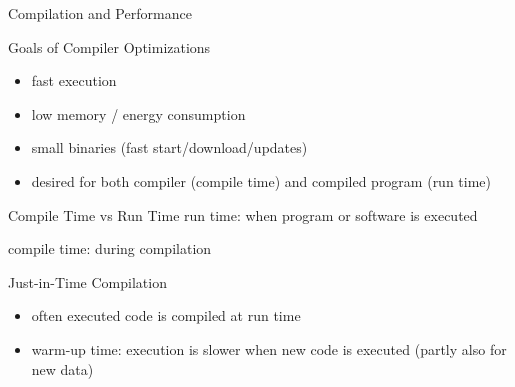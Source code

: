 \begin{frame}{Compilation and Performance}
	\vspace{-10mm}
	\begin{fancycolumns}
		\vspace{15mm}
		\begin{note}{Goals of Compiler Optimizations}
			\begin{itemize}
				\item fast execution
				\item low memory / energy consumption
				\item small binaries (fast start/download/updates)
				\item desired for both compiler (compile time) and compiled program (run time)
			\end{itemize}
		\end{note}
		
		
		\begin{definition}{Compile Time vs Run Time}
			run time: when program or software is executed
			
			compile time: during compilation
		\end{definition}
		\nextcolumn
		\hfill\resizebox{60mm}{!}{\figJIT}
		
		\begin{definition}{Just-in-Time Compilation}
			\begin{itemize}
				\item often executed code is compiled at run time
				\item warm-up time: execution is slower when new code is executed (partly also for new data)
			\end{itemize}
		\end{definition}
	\end{fancycolumns}
\end{frame}

